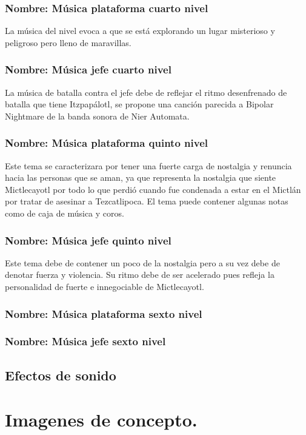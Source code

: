 \documentclass[11pt,letterpaper]{article}
\begin{document}
\subsubsection{Nombre: Música plataforma cuarto nivel}
La música del nivel evoca a que se está explorando un lugar misterioso y peligroso pero lleno de maravillas.
\subsubsection{Nombre: Música jefe cuarto nivel} 
La música de batalla contra el jefe debe de reflejar el ritmo desenfrenado de batalla que tiene Itzpapálotl, se propone una canción parecida a Bipolar Nightmare de la banda sonora de Nier Automata.

\subsubsection{Nombre: Música plataforma quinto nivel}
Este tema se caracterizara por tener una fuerte carga de nostalgia y renuncia hacia las personas que se aman, ya que representa la nostalgia que siente Mictlecayotl por todo lo que perdió cuando fue condenada a estar en el Mictlán por tratar de asesinar a Tezcatlipoca. El tema puede contener algunas notas como de caja de música y coros.
\subsubsection{Nombre: Música jefe quinto nivel} 
Este tema debe de contener un poco de la nostalgia pero a su vez debe de denotar fuerza y violencia. Su ritmo debe de ser acelerado pues refleja la personalidad de fuerte e innegociable de Mictlecayotl.


\subsubsection{Nombre: Música plataforma sexto nivel}
\subsubsection{Nombre: Música jefe sexto nivel} 


\subsection{Efectos de sonido}

\section{Imagenes de concepto.}
\end{document}
